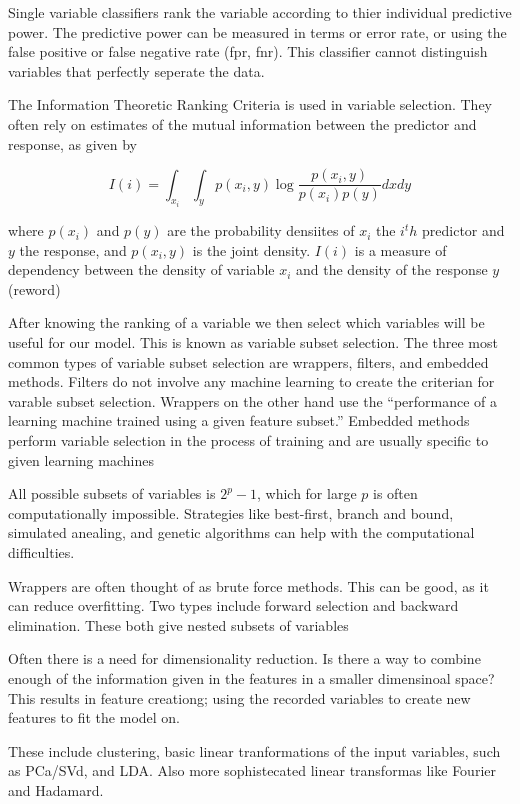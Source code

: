 \documentclass[12pt,twoside]{reedthesis}
\theoremstyle{definition}
\theoremstyle{definition}
\theoremstyle{definition}
\theoremstyle{remark}
\begin{document}
Single variable classifiers rank the variable according to thier
individual predictive power. The predictive power can be measured in
terms or error rate, or using the false positive or false negative rate
(fpr, fnr). This classifier cannot distinguish variables that perfectly
seperate the data.

The Information Theoretic Ranking Criteria is used in variable
selection. They often rely on estimates of the mutual information
between the predictor and response, as given by

\[ I(i) = \int_{x_i}\int_yp(x_i,y)\log\frac{p(x_i,y)}{p(x_i)p(y)}dxdy\]

where \(p(x_i)\) and \(p(y)\) are the probability densiites of \(x_i\)
the \(i^th\) predictor and \(y\) the response, and \(p(x_i,y)\) is the
joint density. \(I(i)\) is a measure of dependency between the density
of variable \(x_i\) and the density of the response \(y\) (reword)

After knowing the ranking of a variable we then select which variables
will be useful for our model. This is known as variable subset
selection. The three most common types of variable subset selection are
wrappers, filters, and embedded methods. Filters do not involve any
machine learning to create the criterian for varable subset selection.
Wrappers on the other hand use the ``performance of a learning machine
trained using a given feature subset.'' Embedded methods perform
variable selection in the process of training and are usually specific
to given learning machines

All possible subsets of variables is \(2^p-1\), which for large \(p\) is
often computationally impossible. Strategies like best-first, branch and
bound, simulated anealing, and genetic algorithms can help with the
computational difficulties.

Wrappers are often thought of as brute force methods. This can be good,
as it can reduce overfitting. Two types include forward selection and
backward elimination. These both give nested subsets of variables

Often there is a need for dimensionality reduction. Is there a way to
combine enough of the information given in the features in a smaller
dimensinoal space? This results in feature creationg; using the recorded
variables to create new features to fit the model on.

These include clustering, basic linear tranformations of the input
variables, such as PCa/SVd, and LDA. Also more sophistecated linear
transformas like Fourier and Hadamard.
\end{document}
